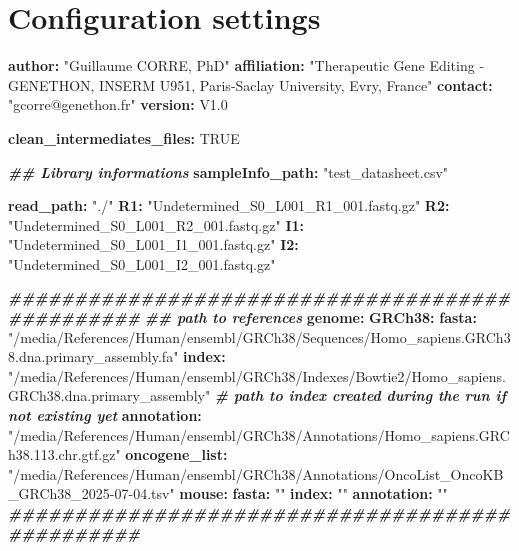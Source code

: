 \documentclass[
]{article}
\newenvironment{Shaded}{\begin{snugshade}}{\end{snugshade}}
\newcommand{\AttributeTok}[1]{\textcolor[rgb]{0.74,0.68,0.62}{#1}}
\newcommand{\CommentTok}[1]{\textcolor[rgb]{0.00,0.40,1.00}{\textbf{\textit{#1}}}}
\newcommand{\FunctionTok}[1]{\textcolor[rgb]{1.00,0.58,0.35}{\textbf{#1}}}
\newcommand{\KeywordTok}[1]{\textcolor[rgb]{0.26,0.66,0.93}{\textbf{#1}}}
\newcommand{\StringTok}[1]{\textcolor[rgb]{0.02,0.61,0.04}{#1}}
\begin{document}
\section{Configuration settings}\label{configuration-settings}

\begin{Shaded}
\begin{Highlighting}[]

\FunctionTok{author}\KeywordTok{:}\AttributeTok{ }\StringTok{"Guillaume CORRE, PhD"}
\FunctionTok{affiliation}\KeywordTok{:}\AttributeTok{ }\StringTok{"Therapeutic Gene Editing {-} GENETHON, INSERM U951, Paris{-}Saclay University, Evry, France"}
\FunctionTok{contact}\KeywordTok{:}\AttributeTok{ }\StringTok{"gcorre@genethon.fr"}
\FunctionTok{version}\KeywordTok{:}\AttributeTok{ }\StringTok{\textquotesingle{}V1.0\textquotesingle{}}

\FunctionTok{clean\_intermediates\_files}\KeywordTok{:}\AttributeTok{ }\StringTok{\textquotesingle{}TRUE\textquotesingle{}}

\CommentTok{\#\# Library informations}
\FunctionTok{sampleInfo\_path}\KeywordTok{:}\AttributeTok{ }\StringTok{"test\_datasheet.csv"}

\FunctionTok{read\_path}\KeywordTok{:}\AttributeTok{  }\StringTok{"./"}
\FunctionTok{R1}\KeywordTok{:}\AttributeTok{ }\StringTok{"Undetermined\_S0\_L001\_R1\_001.fastq.gz"}
\FunctionTok{R2}\KeywordTok{:}\AttributeTok{ }\StringTok{"Undetermined\_S0\_L001\_R2\_001.fastq.gz"}
\FunctionTok{I1}\KeywordTok{:}\AttributeTok{ }\StringTok{"Undetermined\_S0\_L001\_I1\_001.fastq.gz"}
\FunctionTok{I2}\KeywordTok{:}\AttributeTok{ }\StringTok{"Undetermined\_S0\_L001\_I2\_001.fastq.gz"}


\CommentTok{\#\#\#\#\#\#\#\#\#\#\#\#\#\#\#\#\#\#\#\#\#\#\#\#\#\#\#\#\#\#\#\#\#\#\#\#\#\#\#\#\#\#\#\#\#\#\#\#}
\CommentTok{\#\# path to references}
\FunctionTok{genome}\KeywordTok{:}
\AttributeTok{  }\FunctionTok{GRCh38}\KeywordTok{:}
\AttributeTok{    }\FunctionTok{fasta}\KeywordTok{:}\AttributeTok{ }\StringTok{"/media/References/Human/ensembl/GRCh38/Sequences/Homo\_sapiens.GRCh38.dna.primary\_assembly.fa"}
\AttributeTok{    }\FunctionTok{index}\KeywordTok{:}\AttributeTok{ }\StringTok{"/media/References/Human/ensembl/GRCh38/Indexes/Bowtie2/Homo\_sapiens.GRCh38.dna.primary\_assembly"}\CommentTok{ \# path to index created during the run if not existing yet}
\AttributeTok{    }\FunctionTok{annotation}\KeywordTok{:}\AttributeTok{ }\StringTok{"/media/References/Human/ensembl/GRCh38/Annotations/Homo\_sapiens.GRCh38.113.chr.gtf.gz"}
\AttributeTok{    }\FunctionTok{oncogene\_list}\KeywordTok{:}\AttributeTok{ }\StringTok{"/media/References/Human/ensembl/GRCh38/Annotations/OncoList\_OncoKB\_GRCh38\_2025{-}07{-}04.tsv"}
\AttributeTok{  }\FunctionTok{mouse}\KeywordTok{:}
\AttributeTok{    }\FunctionTok{fasta}\KeywordTok{:}\AttributeTok{ }\StringTok{""}
\AttributeTok{    }\FunctionTok{index}\KeywordTok{:}\AttributeTok{ }\StringTok{""}
\AttributeTok{    }\FunctionTok{annotation}\KeywordTok{:}\AttributeTok{ }\StringTok{""}
\CommentTok{\#\#\#\#\#\#\#\#\#\#\#\#\#\#\#\#\#\#\#\#\#\#\#\#\#\#\#\#\#\#\#\#\#\#\#\#\#\#\#\#\#\#\#\#\#\#\#\#}


\end{Highlighting}
\end{Shaded}
\end{document}
